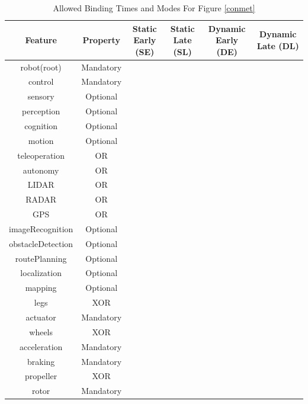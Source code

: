 \documentclass{article}
\newcommand{\xmark}{\ding{55}}%
\begin{document}
\begin{table}[H]
	\caption{Allowed Binding Times and Modes For Figure \ref{conmet}}
	\centering
	\begin{center}
		\begin{tabular}{c c c c c c}
			\hline
			Feature & Property & Static Early (SE) & Static Late (SL) & Dynamic Early (DE) & Dynamic Late (DL) \\\hline
			robot(root) & Mandatory & \checkmark & \xmark & \xmark & \xmark \\ \hline
			control & Mandatory & \checkmark & \checkmark & \xmark & \xmark \\ \hline
			sensory & Optional & \checkmark & \xmark & \xmark & \xmark \\ \hline
			perception & Optional & \checkmark & \xmark & \xmark & \xmark \\ \hline
			cognition & Optional & \checkmark & \xmark & \xmark & \xmark \\ \hline
			motion & Optional & \checkmark & \xmark & \xmark & \xmark \\ \hline
			teleoperation & OR & \checkmark & \checkmark & \checkmark & \checkmark \\ \hline
			autonomy & OR  & \checkmark & \checkmark & \checkmark & \checkmark \\ \hline
			LIDAR & OR  & \checkmark & \checkmark & \checkmark & \checkmark \\ \hline
			RADAR & OR  & \checkmark & \checkmark & \checkmark & \checkmark \\ \hline
			GPS & OR  & \checkmark & \checkmark & \checkmark & \checkmark \\ \hline
			imageRecognition & Optional & \xmark & \xmark & \checkmark & \checkmark \\ \hline
			obstacleDetection & Optional & \xmark & \xmark & \checkmark & \checkmark \\ \hline
			routePlanning & Optional & \xmark & \xmark & \checkmark & \checkmark \\ \hline
			localization & Optional & \xmark & \xmark & \checkmark & \checkmark \\ \hline
			mapping & Optional & \xmark & \xmark & \checkmark & \checkmark \\ \hline
			legs & XOR &\xmark & \xmark & \checkmark & \checkmark \\ \hline
			actuator & Mandatory & \checkmark & \checkmark & \xmark & \xmark \\ \hline
			wheels & XOR & \xmark & \xmark & \checkmark & \checkmark \\ \hline
			acceleration & Mandatory & \checkmark & \checkmark & \xmark & \xmark \\ \hline
			braking & Mandatory & \checkmark & \checkmark & \xmark & \xmark \\ \hline
			propeller & XOR & \xmark & \xmark & \checkmark & \checkmark \\ \hline
			rotor& Mandatory & \checkmark & \checkmark & \xmark & \xmark \\ \hline
			
		\end{tabular}
		\label{tab:rob1}
	\end{center}
\end{table}
\end{document}
